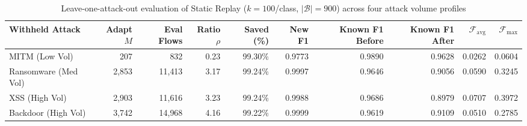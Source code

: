 \begin{table}[htbp]
\centering
\scriptsize
\setlength{\tabcolsep}{3.5pt}
\renewcommand{\arraystretch}{1.25}
\caption{Leave-one-attack-out evaluation of Static Replay ($k = 100$/class, $|\mathcal{B}| = 900$) across four attack volume profiles}
\label{tab:phase8_multi_attack}
\begin{tabular}{|l|r|r|r|r|r|r|r|r|r|}
\hline
\textbf{Withheld Attack} & \textbf{Adapt $M$} & \textbf{Eval Flows} & \textbf{Ratio $\rho$} & \textbf{Saved (\%)} & \textbf{New F1} & \textbf{Known F1 Before} & \textbf{Known F1 After} & $\mathcal{F}_{\text{avg}}$ & $\mathcal{F}_{\max}$ \\ \hline
MITM (Low Vol)        & 207     & 832     & 0.23 & 99.30\% & 0.9773 & 0.9890 & 0.9628 & 0.0262 & 0.0604 \\
Ransomware (Med Vol)  & 2{,}853 & 11{,}413 & 3.17 & 99.24\% & 0.9997 & 0.9646 & 0.9056 & 0.0590 & 0.3245 \\
XSS (High Vol)        & 2{,}903 & 11{,}616 & 3.23 & 99.24\% & 0.9988 & 0.9686 & 0.8979 & 0.0707 & 0.3972 \\
Backdoor (High Vol)   & 3{,}742 & 14{,}968 & 4.16 & 99.22\% & 0.9999 & 0.9619 & 0.9109 & 0.0510 & 0.2785 \\ \hline
\end{tabular}
\end{table}


